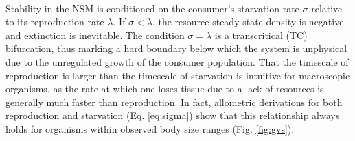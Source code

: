 \documentclass{pnastwo}
\begin{document}
\begin{article}



\vspace{2mm}
 \\ \noindent
Stability in the NSM is conditioned on the consumer's starvation rate $\sigma$ relative to its reproduction rate $\lambda$.
If $\sigma<\lambda$, the resource steady state density is negative and extinction is inevitable.
The condition $\sigma = \lambda$ is a transcritical (TC) bifurcation, thus marking a hard boundary below which the system is unphysical due to the unregulated growth of the consumer population.
That the timescale of reproduction is larger than the timescale of starvation is intuitive for macroscopic organisms, as the rate at which one loses tissue due to a lack of resources is generally much faster than reproduction.
In fact, allometric derivations for both reproduction \cite{Kempes:2012hy} and starvation (Eq. \ref{eq:sigma}) show that this relationship always holds for organisms within observed body size ranges (Fig. \ref{fig:gvs}).

%
%





\end{article}
\end{document}

